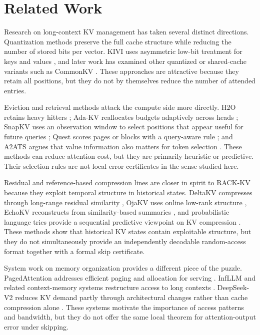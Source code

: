 \section{Related Work}

Research on long-context KV management has taken several distinct directions. Quantization methods preserve the full cache structure while reducing the number of stored bits per vector. KIVI uses asymmetric low-bit treatment for keys and values \citep{liu2024kivi}, and later work has examined other quantized or shared-cache variants such as CommonKV \citep{wang2025commonkv}. These approaches are attractive because they retain all positions, but they do not by themselves reduce the number of attended entries.

Eviction and retrieval methods attack the compute side more directly. H2O retains heavy hitters \citep{zhang2023h2o}; Ada-KV reallocates budgets adaptively across heads \citep{feng2024adakv}; SnapKV uses an observation window to select positions that appear useful for future queries \citep{li2024snapkv}; Quest scores pages or blocks with a query-aware rule \citep{tang2024quest}; and A2ATS argues that value information also matters for token selection \citep{guo2024a2ats}. These methods can reduce attention cost, but they are primarily heuristic or predictive. Their selection rules are not local error certificates in the sense studied here.

Residual and reference-based compression lines are closer in spirit to RACK-KV because they exploit temporal structure in historical states. DeltaKV compresses through long-range residual similarity \citep{hao2026deltakv}, OjaKV uses online low-rank structure \citep{zhu2025ojakv}, EchoKV reconstructs from similarity-based summaries \citep{ji2026echokv}, and probabilistic language tries provide a sequential predictive viewpoint on KV compression \citep{magarshak2026pltries}. These methods show that historical KV states contain exploitable structure, but they do not simultaneously provide an independently decodable random-access format together with a formal skip certificate.

System work on memory organization provides a different piece of the puzzle. PagedAttention addresses efficient paging and allocation for serving \citep{kwon2023pagedattention}. InfLLM and related context-memory systems restructure access to long contexts \citep{xiao2024infllm}. DeepSeek-V2 reduces KV demand partly through architectural changes rather than cache compression alone \citep{deepseekai2024deepseekv2}. These systems motivate the importance of access patterns and bandwidth, but they do not offer the same local theorem for attention-output error under skipping.

